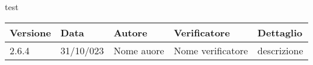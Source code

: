 \documentclass{article}
\begin{document}
    test
    \begin{tabular}{|C{2.5cm}|C{2.5cm}|C{2.5cm}|C{2.5cm}|C{2.5cm}|}
        \hline
        \textbf{Versione} & \textbf{Data} & \textbf{Autore} & \textbf{Verificatore} & \textbf{Dettaglio} \\
        \hline \hline
        \label{Git_Action_Version} 2.6.4 & 31/10/023 & Nome auore & Nome verificatore & descrizione \\
        \hline
    
    \end{tabular}
\end{document}
